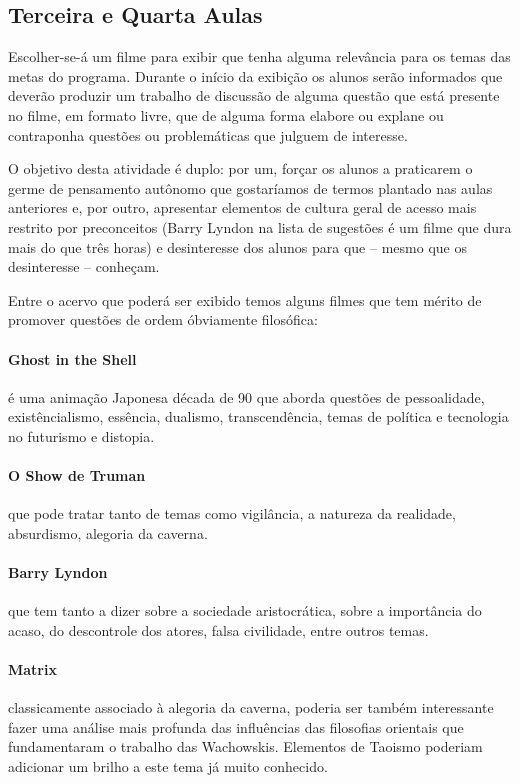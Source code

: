 \documentclass[12pt,a4paper]{article}
\begin{document}
	\subsection*{Terceira e Quarta Aulas}
	
	Escolher-se-á um filme para exibir que tenha alguma relevância 
	para os temas das metas do programa. Durante o início da 
	exibição os alunos serão informados que deverão produzir um 
	trabalho de discussão de alguma questão que está presente no 
	filme, em formato livre, que de alguma forma elabore ou 
	explane ou contraponha questões ou problemáticas que julguem
	de interesse. 

	O objetivo desta atividade é duplo: por um, forçar os alunos 
	a praticarem o germe de pensamento autônomo que gostaríamos 
	de termos plantado nas aulas anteriores e, por outro, apresentar
	elementos de cultura geral de acesso mais restrito por 
	preconceitos (Barry Lyndon na lista de sugestões é um filme 
	que dura mais do que três horas) e desinteresse dos alunos para 
	que -- mesmo que os desinteresse -- conheçam.

	Entre o acervo que poderá ser exibido temos alguns filmes que 
	tem mérito de promover questões de ordem óbviamente filosófica:

	\paragraph{Ghost in the Shell} é uma animação 
		Japonesa década de 90 que aborda questões de 
		pessoalidade, existêncialismo, essência, 
		dualismo, transcendência, temas de política e 
		tecnologia no futurismo e distopia.

	\paragraph{O Show de Truman} que pode tratar tanto de 
		temas como vigilância, a natureza da realidade,
		absurdismo, alegoria da caverna.

	\paragraph{Barry Lyndon} que tem tanto a dizer sobre a 
		sociedade aristocrática, sobre a importância do
		acaso, do descontrole dos atores, falsa 
		civilidade, entre outros temas.

	\paragraph{Matrix} classicamente associado à alegoria 
		da caverna, poderia ser também interessante 
		fazer uma análise mais profunda das influências 
		das filosofias orientais que fundamentaram o 
		trabalho das Wachowskis. Elementos de Taoismo 
		poderiam adicionar um brilho a este tema já 
		muito conhecido.
\end{document}
